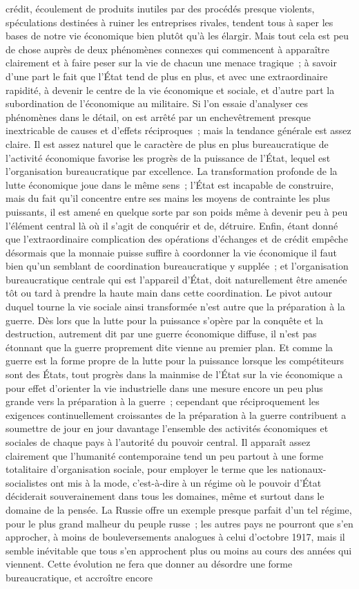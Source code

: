 \documentclass[french,twoside]{book} %
\begin{document}
crédit, écoulement de produits inutiles par des procédés presque violents, spéculations destinées à ruiner les entreprises rivales, tendent tous à saper les bases de notre vie économique bien plutôt qu'à les élargir. Mais tout cela est peu de chose auprès de deux phénomènes connexes qui commencent à apparaître clairement et à faire peser sur la vie de chacun une menace tragique ; à savoir d'une part le fait que l'État tend de plus en plus, et avec une extraordinaire rapidité, à devenir le centre de la vie économique et sociale, et d'autre part la subordination de l'économique au militaire. Si l'on essaie d'analyser ces phénomènes dans le détail, on est arrêté par un enchevêtrement presque inextricable de causes et d'effets réciproques ; mais la tendance générale est assez claire. Il est assez naturel que le caractère de plus en plus bureaucratique de l'activité économique favorise les progrès de la puissance de l'État, lequel est l'organisation bureaucratique par excellence. La transformation profonde de la lutte économique joue dans le même sens ; l'État est incapable de construire, mais du fait qu'il concentre entre ses mains les moyens de contrainte les plus puissants, il est amené en quelque sorte par son poids même à devenir peu à peu l'élément central là où il s'agit de conquérir et de, détruire. Enfin, étant donné que l'extraordinaire complication des opérations d'échanges et de crédit empêche désormais que la monnaie puisse suffire à coordonner la vie économique il faut bien qu'un semblant de coordination bureaucratique y supplée ; et l'organisation bureaucratique centrale qui est l'appareil d'État, doit naturellement être amenée tôt ou tard à prendre la haute main dans cette coordination. Le pivot autour duquel tourne la vie sociale ainsi transformée n'est autre que la préparation à la guerre. Dès lors que la lutte pour la puissance s'opère par la conquête et la destruction, autrement dit par une guerre économique diffuse, il n'est pas étonnant que la guerre proprement dite vienne au premier plan. Et comme la guerre est la forme propre de la lutte pour la puissance lorsque les compétiteurs sont des États, tout progrès dans la mainmise de l'État sur la vie économique a pour effet d'orienter la vie industrielle dans une mesure encore un peu plus grande vers la préparation à la guerre ; cependant que réciproquement les exigences continuellement croissantes de la préparation à la guerre contribuent a soumettre de jour en jour davantage l'ensemble des activités économiques et sociales de chaque pays à l'autorité du pouvoir central. Il apparaît assez clairement que l'humanité contemporaine tend un peu partout à une forme totalitaire d'organisation sociale, pour employer le terme que les nationaux-socialistes ont mis à la mode, c'est-à-dire à un régime où le pouvoir d'État déciderait souverainement dans tous les domaines, même et surtout dans le domaine de la pensée. La Russie offre un exemple presque parfait d'un tel régime, pour le plus grand malheur du peuple russe ; les autres pays ne pourront que s'en approcher, à moins de bouleversements analogues à celui d'octobre 1917, mais il semble inévitable que tous s'en approchent plus ou moins au cours des années qui viennent. Cette évolution ne fera que donner au désordre une forme bureaucratique, et accroître encore 
\end{document}
